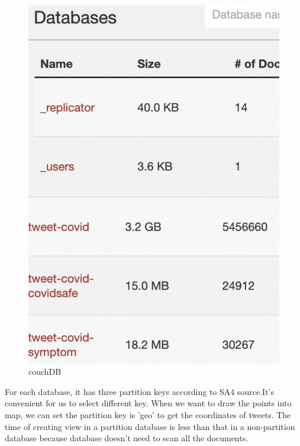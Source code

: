 \begin{figure}[H]
    \centering
    \includegraphics[scale=0.4]{city_analytics/report/images/couchdb.png}
    \caption{couchDB}
    \label{fig:my_label}
\end{figure}

For each database, it has three partition keys according to SA4 source.It's convenient for us to select different key. When we want to draw the points into map, we can set the partition key is 'geo' to get the coordinates of tweets. The time of creating view in a partition database is less than that in a non-partition database because database doesn't need to scan all the documents. 

